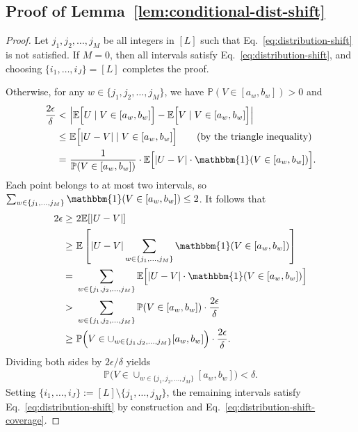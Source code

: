 \documentclass[11pt]{article}
\theoremstyle{statplain}
\theoremstyle{statdefinition}
\newcommand{\E}{\mathbb{E}}
\newcommand{\PP}{\mathbb{P}}
\newcommand{\0}{\mathbf{0}}
\begin{document}
\subsection{Proof of Lemma~\ref{lem:conditional-dist-shift}}
\label{proof_lem:conditional-dist-shift}

\begin{proof}
Let $j_1,j_2,\dots,j_M$ be all integers in $[L]$ such that Eq.~\eqref{eq:distribution-shift} is not satisfied. If $M=0$, then all intervals satisfy Eq.~\eqref{eq:distribution-shift}, and choosing $\{i_1,\dots,i_J\} = [L]$ completes the proof.

Otherwise, for any $w \in \{j_1,j_2,\dots,j_M\}$, we have $\PP(V \in [a_{w},b_{w}]) > 0$ and
\begin{align*}
    \frac{2\epsilon}{\delta} < &~ \Big|\E\Big[U\mid V \in [a_{w},b_{w}]\Big] - \E\Big[V\mid V \in [a_{w},b_{w}]\Big]\Big|\\
    \leq &~ \E\Big[|U-V| \mid V \in [a_{w},b_{w}]\Big] \tag{by the triangle inequality}\\
    = &~ \frac{1}{\PP(V \in [a_{w},b_{w}])} \cdot \E\Big[|U-V| \cdot \mathbbm{1}(V \in [a_{w},b_{w}])\Big].
\end{align*}
Each point belongs to at most two intervals, so  $\sum_{w \in \{j_1,\dots,j_M\}} \mathbbm{1}(V \in [a_w,b_w]) \leq 2$. It follows that
\begin{align*}
    2\epsilon \geq &~ 2\E[|U-V|]\\
    \geq &~ \E\left[|U-V| \sum_{w \in \{j_1,\dots,j_M\}} \mathbbm{1}(V \in [a_{w},b_{w}])\right]\\
    = &~ \sum_{w \in \{j_1,j_2,\dots,j_M\}}\E\Big[|U-V| \cdot \mathbbm{1}(V \in [a_{w},b_{w}])\Big]\\
    > &~ \sum_{w \in \{j_1,j_2,\dots,j_M\}}\PP(V \in [a_{w},b_{w}]) \cdot \frac{2\epsilon}{\delta}\\
    \geq &~ \PP\Big(V \in \cup_{w \in \{j_1,j_2,\dots,j_M\}} [a_w,b_w]\Big) \cdot \frac{2\epsilon}{\delta}.
\end{align*}
Dividing both sides by $2\epsilon/\delta$ yields
\begin{align*}
    \PP\Big(V \in \cup_{w \in \{j_1,j_2,\dots,j_M\}} [a_w,b_w]\Big) < \delta.
\end{align*}
Setting $\{i_1,\dots,i_J\} := [L] \setminus \{j_1,\dots,j_M\}$, the remaining intervals satisfy Eq.~\eqref{eq:distribution-shift} by construction and Eq.~\eqref{eq:distribution-shift-coverage}.
\end{proof}
\end{document}
